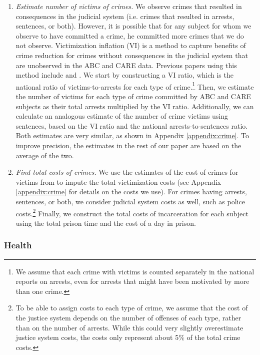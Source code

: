 \begin{enumerate}
\item \textit{Estimate number of victims of crimes.} We observe crimes that resulted in consequences in the judicial system (i.e. crimes that resulted in arrests, sentences, or both). However, it is possible that for any subject for whom we observe to have committed a crime, he committed more crimes that we do not observe. Victimization inflation (VI) is a method to capture benefits of crime reduction for crimes without consequences in the judicial system that are unobserved in the ABC and CARE data. Previous papers using this method include \citet{Belfield_Nores_etal_2006_JHR} and \cite{Heckman_Moon_etal_2010_RateofReturn}. We start by constructing a VI ratio, which is the national ratio of victims-to-arrests for each type of crime.\footnote{We assume that each crime with victims is counted separately in the national reports on arrests, even for arrests that might have been motivated by more than one crime.} Then, we estimate the number of victims for each type of crime committed by ABC and CARE subjects as their total arrests multiplied by the VI ratio. Additionally, we can calculate an analogous estimate of the number of crime victims using sentences, based on the VI ratio and the national arrests-to-sentences ratio. Both estimates are very similar, as shown in Appendix \ref{appendix:crime}. To improve precision, the estimates in the rest of our paper are based on the average of the two.
\item \textit{Find total costs of crimes.} We use the estimates of the cost of crimes for victims from \cite{McCollister_etal_2010_DAD} to impute the total victimization costs (see Appendix \ref{appendix:crime} for details on the costs we use). For crimes having arrests, sentences, or both, we consider judicial system costs as well, such as police costs.\footnote{To be able to assign costs to each type of crime, we assume that the cost of the justice system depends on the number of offenses of each type, rather than on the number of arrests. While this could very slightly overestimate justice system costs, the costs only represent about 5\% of the total crime costs.} Finally, we construct the total costs of incarceration for each subject using the total prison time and the cost of a day in prison.
\end{enumerate}

\subsubsection{Health} \label{section:health}


